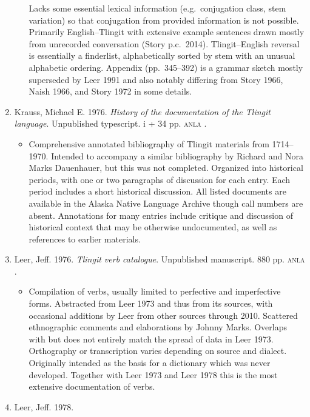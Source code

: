 \documentclass[12pt,letterpaper,oneside,article]{memoir}
\begin{document}
\begin{enumerate}
\begin{itemize}
		Lacks some essential lexical information (e.g.\ conjugation class, stem
		variation) so that conjugation from provided information is not possible.
		Primarily English–Tlingit with extensive example sentences drawn mostly from
		unrecorded conversation (Story p.c.\ 2014).
		Tlingit–English reversal is essentially a finderlist, alphabetically sorted
		by stem with an unusual alphabetic ordering.
		Appendix (pp.\ 345–392) is a grammar sketch mostly superseded by Leer 1991
		and also notably differing from Story 1966, Naish 1966, and Story 1972 in some
		details.
	\end{itemize}
\item	Krauss, Michael E.
	1976.
	\textit{History of the documentation of the Tlingit language}.
	Unpublished typescript.
	i + 34 pp.
	\textsc{anla} .
	\begin{itemize}
	\item	Comprehensive annotated bibliography of Tlingit materials from 1714–1970.
		Intended to accompany a similar bibliography by Richard and Nora
		Marks Dauenhauer, but this was not completed.
		Organized into historical periods, with one or two paragraphs of discussion
		for each entry.
		Each period includes a short historical discussion.
		All listed documents are available in the Alaska Native Language Archive
		though call numbers are absent.
		Annotations for many entries include critique and discussion of historical
		context that may be otherwise undocumented, as well as references to earlier
		materials.
	\end{itemize}
\item	Leer, Jeff.
	1976.
	\textit{Tlingit verb catalogue}.
	Unpublished manuscript.
	880 pp.
	\textsc{anla} .
	\begin{itemize}
	\item	Compilation of verbs, usually limited to perfective and imperfective forms.
		Abstracted from Leer 1973 and thus from its sources, with occasional additions
		by Leer from other sources through 2010.
		Scattered ethnographic comments and elaborations by  Johnny Marks.
		Overlaps with but does not entirely match the spread of data in Leer 1973.
		Orthography or transcription varies depending on source and dialect.
		Originally intended as the basis for a dictionary which was never developed.
		Together with Leer 1973 and Leer 1978 this is the most extensive documentation
		of verbs.
	\end{itemize}
\item	Leer, Jeff.
	1978.

\end{enumerate}
\end{document}
